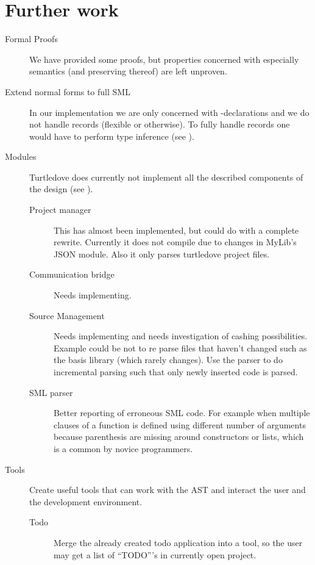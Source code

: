 \section{Further work}
\label{sec:further-work}
\begin{description}
\item[Formal Proofs] We have provided some proofs, but properties concerned with
  especially semantics (and preserving thereof) are left unproven.

\item[Extend normal forms to full SML] In our implementation we are only concerned
  with -declarations and we do not handle records (flexible or
  otherwise). To fully handle records one would have to perform type inference
  (see ).

\item[Modules] Turtledove does currently not implement all the described
  components of the design (see ). 
  \begin{description}
  \item[Project manager] This has almost been implemented, but could do with a
    complete rewrite. Currently it does not compile due to changes in MyLib's
    JSON module. Also it only parses turtledove project files.

  \item[Communication bridge] Needs implementing.

  \item[Source Management] Needs implementing and needs investigation of cashing
    possibilities. Example could be not to re parse files that haven't changed
    such as the basis library (which rarely changes). Use the parser to do
    incremental parsing such that only newly inserted code is parsed.

  \item[SML parser] Better reporting of erroneous SML code. For example when
    multiple clauses of a function is defined using different number of
    arguments because parenthesis are missing around constructors or lists,
    which is a common by novice programmers.
  \end{description}

\item[Tools] Create useful tools that can work with the AST and interact the
  user and the development environment.

  \begin{description}
  \item[Todo] Merge the already created todo application into a tool, so the
    user may get a list of ``TODO'''s in currently open project.


\end{description}
\end{description}
